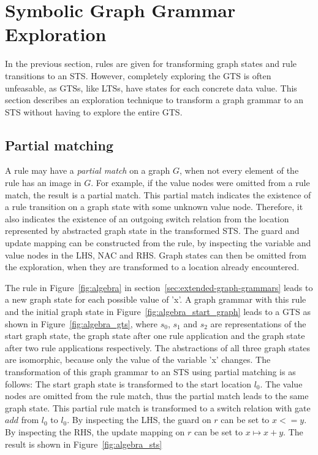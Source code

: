 \section{Symbolic Graph Grammar Exploration}\label{sec:gg-exploration}

In the previous section, rules are given for transforming graph states and rule transitions to an STS. However, completely exploring the GTS is often unfeasable, as GTSs, like LTSs, have states for each concrete data value. This section describes an exploration technique to transform a graph grammar to an STS without having to explore the entire GTS.

\subsection{Partial matching}\label{sec:partial-matching}
A rule may have a \textit{partial match} on a graph $G$, when not every element of the rule has an image in $G$. For example, if the value nodes were omitted from a rule match, the result is a partial match. This partial match indicates the existence of a rule transition on a graph state with some unknown value node. Therefore, it also indicates the existence of an outgoing switch relation from the location represented by abstracted graph state in the transformed STS. The guard and update mapping can be constructed from the rule, by inspecting the variable and value nodes in the LHS, NAC and RHS. Graph states can then be omitted from the exploration, when they are transformed to a location already encountered.

The rule in Figure~\ref{fig:algebra} in section~\ref{sec:extended-graph-grammars} leads to a new graph state for each possible value of 'x'. A graph grammar with this rule and the initial graph state in Figure~\ref{fig:algebra_start_graph} leads to a GTS as shown in Figure~\ref{fig:algebra_gts}, where $s_0$, $s_1$ and $s_2$ are representations of the start graph state, the graph state after one rule application and  the graph state after two rule applications respectively. The abstractions of all three graph states are isomorphic, because only the value of the variable 'x' changes. The transformation of this graph grammar to an STS using partial matching is as follows: The start graph state is transformed to the start location $l_0$. The value nodes are omitted from the rule match, thus the partial match leads to the same graph state. This partial rule match is transformed to a switch relation with gate $add$ from $l_0$ to $l_0$. By inspecting the LHS, the guard on $r$ can be set to $x <= y$. By inspecting the RHS, the update mapping on $r$ can be set to $x \mapsto x + y$. The result is shown in Figure~\ref{fig:algebra_sts}

